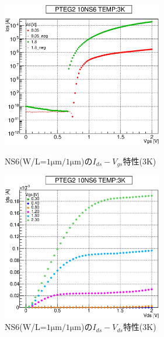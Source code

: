 				\begin{figure}[htbp]
					\begin{minipage}{0.5\hsize}
						\begin{center}
							\includegraphics[width=70mm]{./Chapter/Appendix/Picture/NST/NS6/PTEG2_10_NS6_IdVg_3K.eps}
						\end{center}
						\caption{NS6(W/L=$1\mathrm{\mu m}/1\mathrm{\mu m}$)の$I_{ds}-V_{gs}$特性(3K)}
						\label{fig:NS6_IdVg_3K}
					\end{minipage}
					\begin{minipage}{0.5\hsize}
						\begin{center}
							\includegraphics[width=70mm]{./Chapter/Appendix/Picture/NST/NS6/PTEG2_10_NS6_IdVd_3K.eps}
						\end{center}
						\caption{NS6(W/L=$1\mathrm{\mu m}/1\mathrm{\mu m}$)の$I_{ds}-V_{ds}$特性(3K)}
						\label{fig:NS6_IdVd_3K}
					\end{minipage}
				\end{figure}
